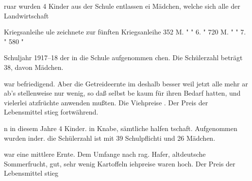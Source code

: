 

\pstart
{}%
ruar wurden 4 Kinder aus der Schule entlassen\ob
ei Mädchen, welche sich alle der Landwirtschaft

Kriegsanleihe\ob
{}%
ule zeichnete zur fünften Kriegsanleihe 352 M.\ob
 "     "    6.     "                    720 M.\ob
 "     "    7.     "                    580 "

Schuljahr 1917–18\ob
{}%
der in die Schule aufgenommen\ob
chen. Die Schülerzahl beträgt 38, davon Mädchen.

\pend
{}
\pstart

%
 war befriedigend. Aber die Getreideernte im\ob
 deshalb besser weil jetzt alle mehr ar\ohb
ab's stellenweise nur wenig, so daß selbst be\ohb
kaum für ihren Bedarf hatten, und vielerlei\ob
atzfrüchte anwenden mußten. Die Viehpreise\ob
. Der Preis der Lebensmittel stieg fortwährend.

\pend
{}
\pstart

%
n in diesem Jahre 4 Kinder.\ob
in Knabe, sämtliche halfen\ob
tschaft. Aufgenommen wurden\ob
inder. die Schülerzahl ist mit 39 Schulpflichti\ohb
und 26 Mädchen.

\pend
{}
\pstart

%
 war eine mittlere Ernte. Dem Umfange nach\ob
rag. Hafer, altdeutsche Sommerfrucht, gut, sehr wenig Kartoffeln\ob
iehpreise waren hoch. Der Preis der Lebensmittel stieg\ob
\pend
